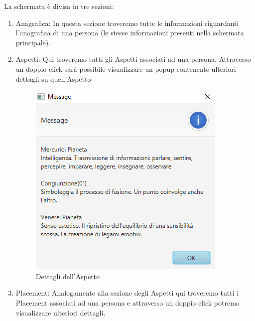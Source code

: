 La schermata è divisa in tre sezioni:
\begin{enumerate}
  \item Anagrafica: In questa sezione troveremo tutte le informazioni riguardanti l’anagrafica di una persona (le stesse informazioni presenti nella schermata principale).
  \item Aspetti:
  Qui troveremo tutti gli Aspetti associati ad una persona. Attraverso un doppio click sarà possibile visualizzare un popup contenente ulteriori dettagli su quell’Aspetto
  \begin{figure}[H]
  \centering
  \includegraphics[width=\textwidth, height=0.35\textheight, keepaspectratio]{img/c5/AspectPopup.png}
  \caption{Dettagli dell'Aspetto}
  \label{fig:asppop}
  \end{figure}
  \item Placement:
  Analogamente alla sezione degli Aspetti qui troveremo tutti i Placement associati ad una persona e attraverso un doppio click potremo visualizzare ulteriori dettagli.
  \begin{figure}[H]
  \centering

\end{figure}
\end{enumerate}
